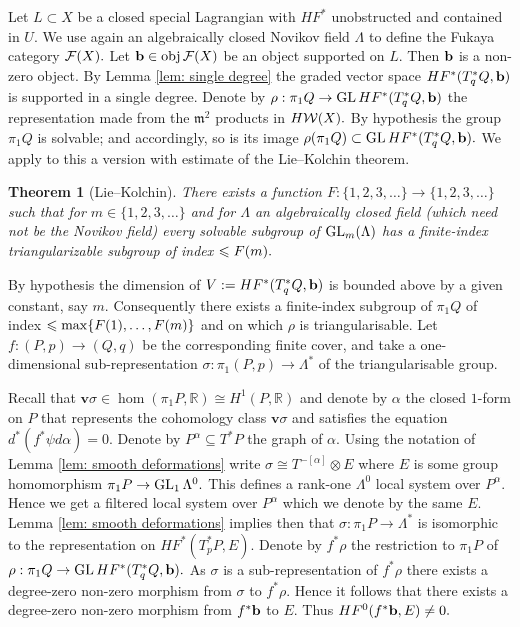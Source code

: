 \documentclass{article}
\theoremstyle{plain}%
\newtheorem{thm}{Theorem}[section]
\theoremstyle{definition}
\numberwithin{equation}{section}
\numberwithin{figure}{section}
\def\l{\label}
\def\fm{{\mathfrak m}}
\def\GL{\mathop{\rm GL}}
\def\le{\leqslant\nobreak}
\def\cF{{\mathbin{\cal F}}}
\def\cW{{\mathbin{\cal W}}}
\def\R{{\mathbin{\mathbb R}}}
\def\al{\alpha}
\def\si{\sigma}
\def\ps{\psi}
\def\r{\rho}
\def\La{\Lambda}
\def\sb{\subseteq}
\def\v{{\mathbf{v}}}\def\cl{{\rm cl}}\def\alg{{\rm alg}}\def\geom{{\rm geom}}\def\loc{{\rm loc}}\def\dirlim{\displaystyle\varinjlim}
\begin{document}
Let $L\subset X$ be a closed special Lagrangian with $HF^*$ unobstructed and contained in $U.$ We use again an algebraically closed Novikov field $\La$ to define the Fukaya category $\cF(X).$ Let $\b\in\obj\cF(X)$ be an object supported on $L.$
Then ${\mathbf{b}}$ is a non-zero object. By Lemma \ref{lem: single degree} the graded vector space $HF^*(T_q^*Q,{\mathbf{b}})$ is supported in a single degree. Denote by $\r:\pi_1Q\to \GL HF^*(T_q^*Q,\b)$ the representation made from the $\fm^2$ products in $H\cW(X).$
By hypothesis the group $\pi_1Q$ is solvable; and accordingly, so is its image $\r(\pi_1Q)\subset \GL HF^*(T_q^*Q,\b).$ We apply to this a version with estimate of the Lie--Kolchin theorem.
\begin{thm}[Lie--Kolchin]\l{thm: LC}
There exists a function $F:\{1,2,3,\dots\}\to \{1,2,3,\dots\}$ such that for $m\in\{1,2,3,\dots\}$ and for $\La$ an algebraically closed field (which need not be the Novikov field) every solvable subgroup of $\GL_m(\La)$ has a finite-index triangularizable subgroup of index $\le F(m).$
\end{thm}

By hypothesis the dimension of $V:=HF^*(T_q^*Q,{\mathbf{b}})$ is bounded above by a given constant, say $m.$ Consequently there exists a finite-index subgroup of $\pi_1Q$ of index $\le \max\{F(1),\dots,F(m)\}$ and on which $\r$ is triangularisable. Let $f:(P,p)\to(Q,q)$ be the corresponding finite cover,
and take a one-dimensional sub-representation $\si:\pi_1(P,p)\to \La^*$ of the triangularisable group. 

Recall that $\v\si\in \hom(\pi_1P,\R)\cong H^1(P,\R)$ and denote by $\al$ the closed $1$-form on $P$ that represents the cohomology class $\v\si$ and satisfies the equation $d^*(f^*\ps d\al)=0.$ Denote by $P^\al\sb T^*P$ the graph of $\al.$
Using the notation of Lemma \ref{lem: smooth deformations} write $\si\cong T^{-[\al]}\otimes E$ where $E$ is some group homomorphism $\pi_1P\to\GL_1\La^0.$ This defines a rank-one $\La^0$ local system over $P^\al.$ Hence we get a filtered local system over $P^\al$ which we denote by the same $E.$
Lemma \ref{lem: smooth deformations} implies then that $\si:\pi_1P\to\La^*$ is isomorphic to the representation on $HF^*(T_p^*P,E).$
Denote by $f^*\rho$ the restriction to $\pi_1P$ of $\rho:\pi_1Q\to \GL HF^*(T_q^*Q,\b).$
As $\si$ is a sub-representation of $f^*\rho$ there exists a degree-zero non-zero morphism from $\si$ to $f^*\rho.$ Hence it follows that there exists a degree-zero non-zero morphism from $f^*{\mathbf{b}}$ to $E.$ Thus $HF^0(f^*{\mathbf{b}},E)\ne0.$
\end{document}
